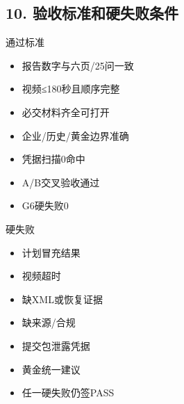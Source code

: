 \documentclass[UTF8,openany,zihao=-4]{ctexbook}
\renewcommand{\_}{\textunderscore\allowbreak}
\begin{document}
\subsection*{10. 验收标准和硬失败条件}
\begin{statusbox}{通过标准}
\begin{itemize}[label=$\square$]
\item 报告数字与六页/25问一致
\item 视频≤180秒且顺序完整
\item 必交材料齐全可打开
\item 企业/历史/黄金边界准确
\item 凭据扫描0命中
\item A/B交叉验收通过
\item G6硬失败0
\end{itemize}
\end{statusbox}
\begin{dangerbox}{硬失败}
\begin{itemize}
\item 计划冒充结果
\item 视频超时
\item 缺XML或恢复证据
\item 缺来源/合规
\item 提交包泄露凭据
\item 黄金统一建议
\item 任一硬失败仍签PASS
\end{itemize}
\end{dangerbox}
\end{document}
